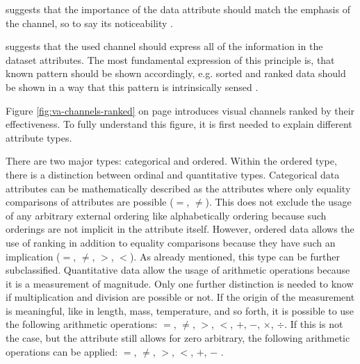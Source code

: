 \begin{enumerate}
 suggests that the importance of the data attribute should match the emphasis of the channel, so to say its noticeability .


 suggests that the used channel should express all of the information in the dataset attributes. The most fundamental expression of this principle is, that known pattern should be shown accordingly, e.g. sorted and ranked data should be shown in a way that this pattern is intrinsically sensed .
\end{enumerate}

Figure \ref{fig:va-channels-ranked} on page \pageref{fig:va-channels-ranked} introduces visual channels ranked by their effectiveness. To fully understand this figure, it is first needed to explain different attribute types.

There are two major types: categorical and ordered. Within the ordered type, there is a distinction between ordinal and quantitative types. Categorical data attributes can be mathematically described as the attributes where only equality comparisons of attributes are possible ($=$, $\neq$). This does not exclude the usage of any arbitrary external ordering like alphabetically ordering because such orderings are not implicit in the attribute itself. However, ordered data allows the use of ranking in addition to equality comparisons because they have such an implication ($=$, $\neq$, $>$, $<$). As already mentioned, this type can be further subclassified. Quantitative data allow the usage of arithmetic operations because it is a measurement of magnitude. Only one further distinction is needed to know if multiplication and division are possible or not. If the origin of the measurement is meaningful, like in length, mass, temperature, and so forth, it is possible to use the following arithmetic operations: $=$, $\neq$, $>$, $<$, $+$, $-$, $\times$, $\div$. If this is not the case, but the attribute still allows for zero arbitrary, the following arithmetic operations can be applied: $=$, $\neq$, $>$, $<$, $+$, $-$ .

